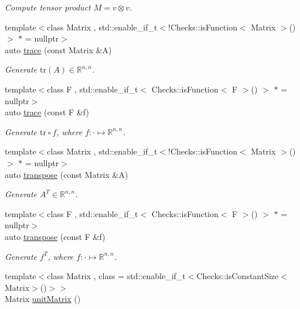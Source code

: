 \begin{DoxyCompactItemize}
\begin{DoxyCompactList}\small\item\em Compute tensor product $ M = v \otimes v $. \end{DoxyCompactList}\item 
{\footnotesize template$<$class Matrix , std\-::enable\-\_\-if\-\_\-t$<$!\-Checks\-::is\-Function$<$ Matrix $>$()$>$ $\ast$  = nullptr$>$ }\\auto \hyperlink{group__LinearAlgebraGroup_gaeb83634a988175e17cda9206619dc87e}{trace} (const Matrix \&A)
\begin{DoxyCompactList}\small\item\em Generate $\mathrm{tr}(A)\in\mathbb{R}^{n,n}$. \end{DoxyCompactList}\item 
{\footnotesize template$<$class F , std\-::enable\-\_\-if\-\_\-t$<$ Checks\-::is\-Function$<$ F $>$() $>$ $\ast$  = nullptr$>$ }\\auto \hyperlink{group__LinearAlgebraGroup_ga16931a1c71fa12799e8275c404387fba}{trace} (const F \&f)
\begin{DoxyCompactList}\small\item\em Generate $\mathrm{tr}\circ f$, where $f:\cdot\mapsto\mathbb{R}^{n,n} $. \end{DoxyCompactList}\item 
{\footnotesize template$<$class Matrix , std\-::enable\-\_\-if\-\_\-t$<$!\-Checks\-::is\-Function$<$ Matrix $>$()$>$ $\ast$  = nullptr$>$ }\\auto \hyperlink{group__LinearAlgebraGroup_gac2512740d1417713c297b71420212f09}{transpose} (const Matrix \&A)
\begin{DoxyCompactList}\small\item\em Generate $A^T\in\mathbb{R}^{n,n}$. \end{DoxyCompactList}\item 
{\footnotesize template$<$class F , std\-::enable\-\_\-if\-\_\-t$<$ Checks\-::is\-Function$<$ F $>$() $>$ $\ast$  = nullptr$>$ }\\auto \hyperlink{group__LinearAlgebraGroup_ga6e5faa927c52ea1963be57e501ebdc6c}{transpose} (const F \&f)
\begin{DoxyCompactList}\small\item\em Generate $f^T$, where $f:\cdot\mapsto\mathbb{R}^{n,n} $. \end{DoxyCompactList}\item 
{\footnotesize template$<$class Matrix , class  = std\-::enable\-\_\-if\-\_\-t$<$\-Checks\-::is\-Constant\-Size$<$\-Matrix$>$()$>$$>$ }\\Matrix \hyperlink{group__LinearAlgebraGroup_ga04d388790cbcaac909faeb3b930c7ae7}{unit\-Matrix} ()

\end{DoxyCompactItemize}
